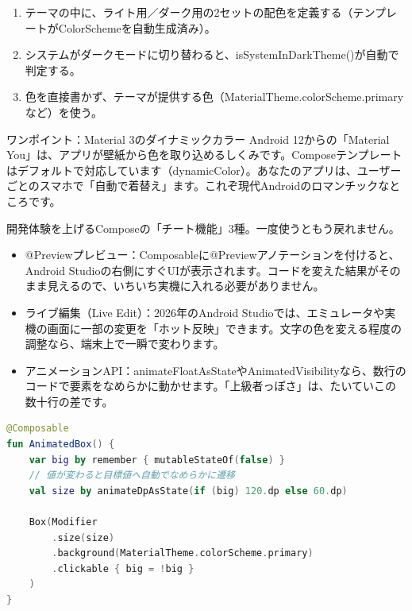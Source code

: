 \begin{enumerate}
  \item テーマの中に、ライト用／ダーク用の2セットの配色を定義する（テンプレートがColorSchemeを自動生成済み）。
  \item システムがダークモードに切り替わると、isSystemInDarkTheme()が自動で判定する。
  \item 色を直接書かず、テーマが提供する色（MaterialTheme.colorScheme.primaryなど）を使う。
\end{enumerate}

\begin{tcbinfo}{ワンポイント：Material 3のダイナミックカラー}
Android 12からの「Material You」は、アプリが壁紙から色を取り込めるしくみです。Composeテンプレートはデフォルトで対応しています（dynamicColor）。あなたのアプリは、ユーザーごとのスマホで「自動で着替え」ます。これぞ現代Androidのロマンチックなところです。

\end{tcbinfo}


開発体験を上げるComposeの「チート機能」3種。一度使うともう戻れません。

\begin{itemize}
  \item @Previewプレビュー：Composableに@Previewアノテーションを付けると、Android Studioの右側にすぐUIが表示されます。コードを変えた結果がそのまま見えるので、いちいち実機に入れる必要がありません。
  \item ライブ編集（Live Edit）：2026年のAndroid Studioでは、エミュレータや実機の画面に一部の変更を「ホット反映」できます。文字の色を変える程度の調整なら、端末上で一瞬で変わります。
  \item アニメーションAPI：animateFloatAsStateやAnimatedVisibilityなら、数行のコードで要素をなめらかに動かせます。「上級者っぽさ」は、たいていこの数十行の差です。
\end{itemize}

\begin{lstlisting}[language=Kotlin]
@Composable
fun AnimatedBox() {
    var big by remember { mutableStateOf(false) }
    // 値が変わると目標値へ自動でなめらかに遷移
    val size by animateDpAsState(if (big) 120.dp else 60.dp)

    Box(Modifier
        .size(size)
        .background(MaterialTheme.colorScheme.primary)
        .clickable { big = !big }
    )
}
\end{lstlisting}


